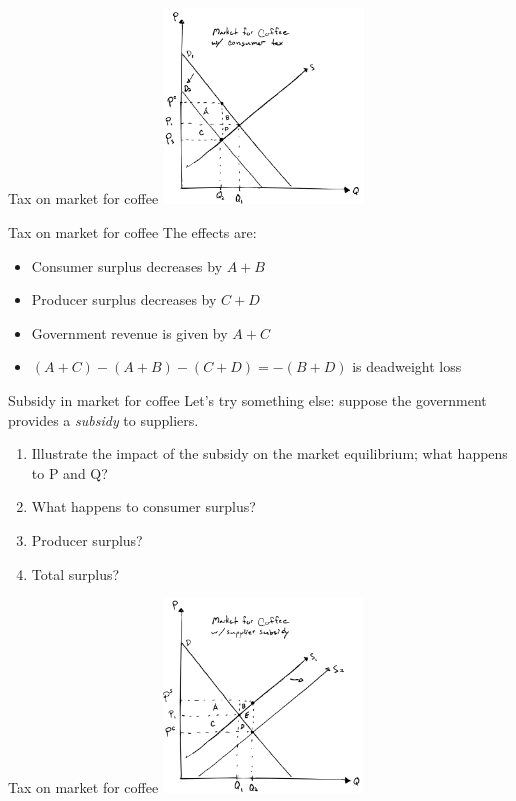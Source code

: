 \documentclass[aspectratio=169]{beamer}
\begin{document}
\begin{frame}{Tax on market for coffee}
    \centering
    \includegraphics[width = 0.4\textwidth,keepaspectratio]{coffee4.png}
\end{frame}

\begin{frame}{Tax on market for coffee}
    The effects are:
    \begin{itemize}
        \item Consumer surplus decreases by $A + B$
        \item Producer surplus decreases by $C + D$
        \item Government revenue is given by $A + C$
        \item $(A+C) - (A+B) - (C+D) = -(B + D)$ is deadweight loss
    \end{itemize}
\end{frame}

\begin{frame}{Subsidy in market for coffee}
    Let's try something else: suppose the government provides a \textit{subsidy} to suppliers.

    \vspace{2mm}

    \begin{enumerate}
        \item Illustrate the impact of the subsidy on the market equilibrium; what happens to P and Q?
        \item What happens to consumer surplus?
        \item Producer surplus?
        \item Total surplus?
    \end{enumerate}
\end{frame}

\begin{frame}{Tax on market for coffee}
    \centering
    \includegraphics[width = 0.4\textwidth,keepaspectratio]{coffee3.png}
\end{frame}
\end{document}
